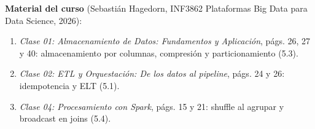 \documentclass[11pt]{article}
\begin{document}

\textbf{Material del curso} (Sebastián Hagedorn, INF3862 Plataformas Big Data
para Data Science, 2026):
\begin{enumerate}
  \item \emph{Clase 01: Almacenamiento de Datos: Fundamentos y Aplicación},
  págs. 26, 27 y 40: almacenamiento por columnas, compresión y
  particionamiento (5.3).
  \item \emph{Clase 02: ETL y Orquestación: De los datos al pipeline}, págs.
  24 y 26: idempotencia y ELT (5.1).
  \item \emph{Clase 04: Procesamiento con Spark}, págs. 15 y 21: shuffle al
  agrupar y broadcast en joins (5.4).
\end{enumerate}
\endgroup
\end{document}
